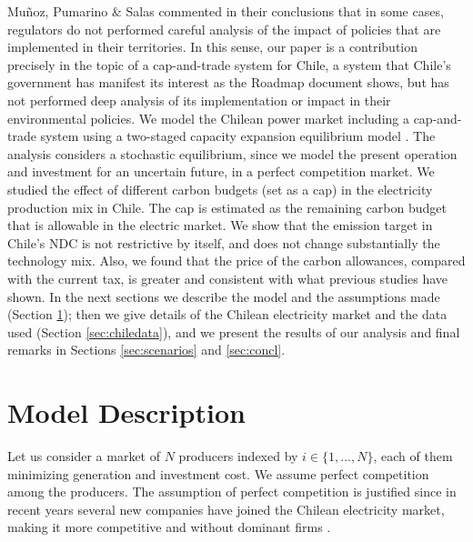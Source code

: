 \documentclass[11pt, letterpaper]{article}
\begin{document}
Mu\~{n}oz, Pumarino \& Salas \cite{munoz2017aiming} commented in their conclusions that in some cases, regulators do not performed careful analysis of the impact of policies that are implemented in their territories. In this sense, our paper is a contribution precisely in the topic of a cap-and-trade system for Chile, a system that Chile's government has manifest its interest as the Roadmap document shows, but has not performed deep analysis of its implementation or impact in their environmental policies. We model the Chilean power market including a cap-and-trade system using a two-staged capacity expansion equilibrium model \cite{ehrenmann2011stochastic}. The analysis considers a stochastic equilibrium, since we model the present operation and investment for an uncertain future, in a perfect competition market. We studied the effect of different carbon budgets (set as a cap) in the electricity production mix in Chile. The cap is estimated as the remaining carbon budget that is allowable in the electric market. We show that the emission target in Chile's NDC is not restrictive by itself, and does not change substantially the technology mix. Also, we found that the price of the carbon allowances, compared with the current tax, is greater and consistent with what previous studies have shown. In the next sections we describe the model and the assumptions made (Section \ref{sec:model}); then we give details of the Chilean electricity market and the data used (Section \ref{sec:chiledata}), and we present the results of our analysis and final remarks in Sections \ref{sec:scenarios} and \ref{sec:concl}. 





\section{Model Description}\label{sec:model}

Let us consider a market of $N$ producers indexed by $i\in\{1,...,N\}$, each of them minimizing generation and investment cost. We assume perfect competition among the producers. The assumption of perfect competition is justified since in recent years several new companies have joined the Chilean electricity market, making it more competitive and without dominant firms \cite{diaz2020equilibrium,munoz2017aiming}. 
\end{document}
